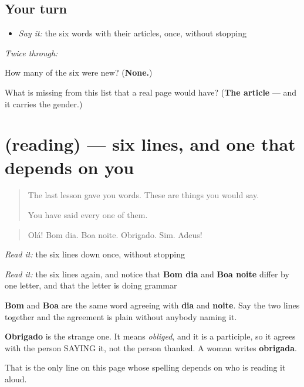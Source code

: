 \subsection*{Your turn}
\begin{itemize}
\raggedright
  \item \emph{Say it:} the six words with their articles, once, without stopping
\end{itemize}

\emph{Twice through:}

\begin{tcolorbox}[breakable,colback=teal!4,colframe=teal!35!black,title={Before you move on}]
How many of the six were new? (\textbf{None.})

What is missing from this list that a real page would have? (\textbf{The article} — and it carries the gender.)
\end{tcolorbox}
\section[(reading)]{(reading) — six lines, and one that depends on you}

\label{lesson:PT-C29-linhas}



\begin{quote}
The last lesson gave you words. These are things you would say.

You have said every one of them.
\end{quote}

\begin{tcolorbox}[breakable,skin=enhanced,colback=orange!6,colframe=orange!45!black,boxrule=0.5pt,arc=1mm,left=6pt,right=6pt,top=4pt,bottom=4pt,fonttitle=\bfseries,title={Read this}]
\begin{quote}
Olá! Bom dia. Boa noite. Obrigado. Sim. Adeus!
\end{quote}

\emph{Read it:} the six lines down once, without stopping

\emph{Read it:} the six lines again, and notice that \textbf{Bom dia} and \textbf{Boa noite} differ by one letter, and that the letter is doing grammar
\end{tcolorbox}

\begin{culture}
\textbf{Bom} and \textbf{Boa} are the same word agreeing with \textbf{dia} and \textbf{noite}. Say the two lines together and the agreement is plain without anybody naming it.

\textbf{Obrigado} is the strange one. It means \emph{obliged}, and it is a participle, so it agrees with the person SAYING it, not the person thanked. A woman writes \textbf{obrigada}.

That is the only line on this page whose spelling depends on who is reading it aloud.
\end{culture}

